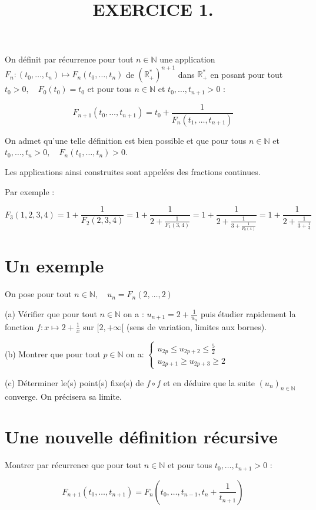 \documentclass[10pt]{article}
\title{EXERCICE 1. }
\author{}
\date{}
\begin{document}
\maketitle
On définit par récurrence pour tout $n \in \mathbb{N}$ une application $F_{n}:\left(t_{0}, \ldots, t_{n}\right) \longmapsto F_{n}\left(t_{0}, \ldots, t_{n}\right)$ de $\left(\mathbb{R}_{+}^{*}\right)^{n+1}$ dans $\mathbb{R}_{+}^{*}$ en posant pour tout $t_{0}>0, \quad F_{0}\left(t_{0}\right)=t_{0}$ et pour tous $n \in \mathbb{N}$ et $t_{0}, \ldots, t_{n+1}>0$ :

$$
F_{n+1}\left(t_{0}, \ldots, t_{n+1}\right)=t_{0}+\frac{1}{F_{n}\left(t_{1}, \ldots, t_{n+1}\right)}
$$

On admet qu'une telle définition est bien possible et que pour tous $n \in \mathbb{N}$ et $t_{0}, \ldots, t_{n}>0, \quad F_{n}\left(t_{0}, \ldots, t_{n}\right)>0$.

Les applications ainsi construites sont appelées des fractions continues.

Par exemple :

$$
F_{3}(1,2,3,4)=1+\frac{1}{F_{2}(2,3,4)}=1+\frac{1}{2+\frac{1}{F_{1}(3,4)}}=1+\frac{1}{2+\frac{1}{3+\frac{1}{F_{0}(4)}}}=1+\frac{1}{2+\frac{1}{3+\frac{1}{4}}}
$$

\section{Un exemple}
On pose pour tout $n \in \mathbb{N}, \quad u_{n}=F_{n}(2, \ldots, 2)$

(a) Vérifier que pour tout $n \in \mathbb{N}$ on a : $u_{n+1}=2+\frac{1}{u_{n}}$ puis étudier rapidement la fonction $f: x \longmapsto 2+\frac{1}{x}$ sur $[2,+\infty[$ (sens de variation, limites aux bornes).

(b) Montrer que pour tout $p \in \mathbb{N}$ on a: $\left\{\begin{array}{l}u_{2 p} \leqslant u_{2 p+2} \leqslant \frac{5}{2} \\ u_{2 p+1} \geqslant u_{2 p+3} \geqslant 2\end{array}\right.$

(c) Déterminer le(s) point(s) fixe(s) de $f \circ f$ et en déduire que la suite $\left(u_{n}\right)_{n \in \mathbb{N}}$ converge. On précisera sa limite.

\section{Une nouvelle définition récursive}
Montrer par récurrence que pour tout $n \in \mathbb{N}$ et pour tous $t_{0}, \ldots, t_{n+1}>0$ :

$$
F_{n+1}\left(t_{0}, \ldots, t_{n+1}\right)=F_{n}\left(t_{0}, \ldots, t_{n-1}, t_{n}+\frac{1}{t_{n+1}}\right)
$$
\end{document}
